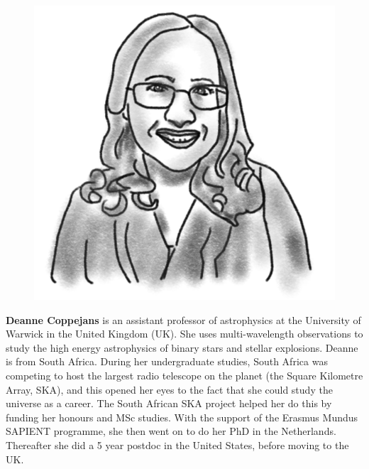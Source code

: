 \begin{figure}
\vspace{35pt}
\includegraphics[width=0.9\linewidth]{portraits/deanne.png}
\end{figure}
\textbf{Deanne Coppejans} is an assistant professor of astrophysics at the University of Warwick in the United Kingdom (UK). She uses multi-wavelength observations to study the high energy astrophysics of binary stars and stellar explosions. Deanne is from South Africa. During her undergraduate studies, South Africa was competing to host the largest radio telescope on the planet (the Square Kilometre Array, SKA), and this opened her eyes to the fact that she could study the universe as a career. The South African SKA project helped her do this by funding her honours and MSc studies. With the support of the Erasmus Mundus SAPIENT programme, she then went on to do her PhD in the Netherlands. Thereafter she did a 5 year postdoc in the United States, before moving to the UK.\\
\\

\vspace{-10pt}

